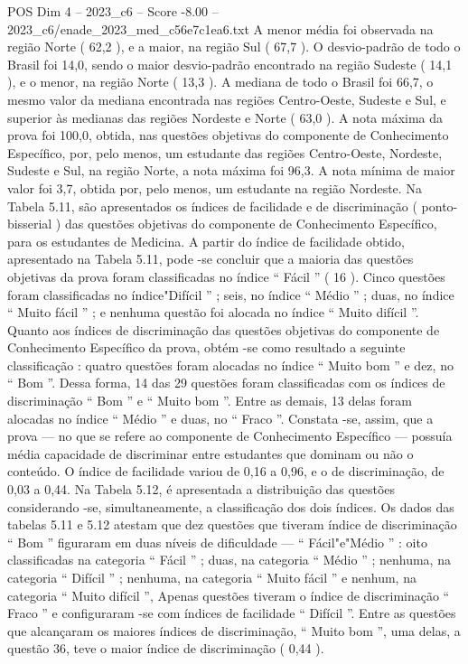 \begin{textsample}{POS Dim 4 – 2023\_c6 – Score -8.00 – 2023\_c6/enade\_2023\_med\_c56e7c1ea6.txt}
A menor média foi observada na região Norte ( 62,2 ), e a maior, na região Sul ( 67,7 ).
O desvio-padrão de todo o Brasil foi 14,0, sendo o maior desvio-padrão encontrado na região Sudeste ( 14,1 ), e o menor, na região Norte ( 13,3 ).
A mediana de todo o Brasil foi 66,7, o mesmo valor da mediana encontrada nas regiões Centro-Oeste, Sudeste e Sul, e superior às medianas das regiões Nordeste e Norte ( 63,0 ).
A nota máxima da prova foi 100,0, obtida, nas questões objetivas do componente de Conhecimento Específico, por, pelo menos, um estudante das regiões Centro-Oeste, Nordeste, Sudeste e Sul, na região Norte, a nota máxima foi 96,3.
A nota mínima de maior valor foi 3,7, obtida por, pelo menos, um estudante na região Nordeste.
Na Tabela 5.11, são apresentados os índices de facilidade e de discriminação ( ponto-bisserial ) das questões objetivas do componente de Conhecimento Específico, para os estudantes de Medicina.
A partir do índice de facilidade obtido, apresentado na Tabela 5.11, pode -se concluir que a maioria das questões objetivas da prova foram classificadas no índice “ Fácil ” ( 16 ).
Cinco questões foram classificadas no índice"Difícil ” ; seis, no índice “ Médio ” ; duas, no índice “ Muito fácil ” ; e nenhuma questão foi alocada no índice “ Muito difícil ”.
Quanto aos índices de discriminação das questões objetivas do componente de Conhecimento Específico da prova, obtém -se como resultado a seguinte classificação : quatro questões foram alocadas no índice “ Muito bom ” e dez, no “ Bom ”.
Dessa forma, 14 das 29 questões foram classificadas com os índices de discriminação “ Bom ” e “ Muito bom ”.
Entre as demais, 13 delas foram alocadas no índice “ Médio ” e duas, no “ Fraco ”.
Constata -se, assim, que a prova — no que se refere ao componente de Conhecimento Específico — possuía média capacidade de discriminar entre estudantes que dominam ou não o conteúdo.
O índice de facilidade variou de 0,16 a 0,96, e o de discriminação, de 0,03 a 0,44.
Na Tabela 5.12, é apresentada a distribuição das questões considerando -se, simultaneamente, a classificação dos dois índices.
Os dados das tabelas 5.11 e 5.12 atestam que dez questões que tiveram índice de discriminação “ Bom ” figuraram em duas níveis de dificuldade — “ Fácil"e"Médio ” : oito classificadas na categoria “ Fácil ” ; duas, na categoria “ Médio ” ; nenhuma, na categoria “ Difícil ” ; nenhuma, na categoria “ Muito fácil ” e nenhum, na categoria “ Muito difícil ”, Apenas questões tiveram o índice de discriminação “ Fraco ” e configuraram -se com índices de facilidade “ Difícil ”.
Entre as questões que alcançaram os maiores índices de discriminação, “ Muito bom ”, uma delas, a questão 36, teve o maior índice de discriminação ( 0,44 ).

\end{textsample}
